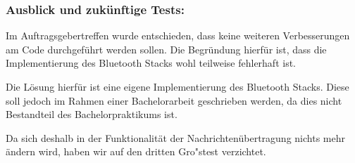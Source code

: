 \subsubsection{Ausblick und zukünftige
Tests:}\label{ausblick-und-zukuxfcnftige-tests}

Im Auftragsgebertreffen wurde entschieden, dass keine weiteren
Verbesserungen am Code durchgeführt werden sollen. Die Begründung
hierfür ist, dass die Implementierung des Bluetooth Stacks wohl
teilweise fehlerhaft ist.

Die Lösung hierfür ist eine eigene Implementierung des Bluetooth Stacks.
Diese soll jedoch im Rahmen einer Bachelorarbeit geschrieben werden, da
dies nicht Bestandteil des Bachelorpraktikums ist.

Da sich deshalb in der Funktionalität der Nachrichtenübertragung nichts
mehr ändern wird, haben wir auf den dritten Gro"stest verzichtet.
